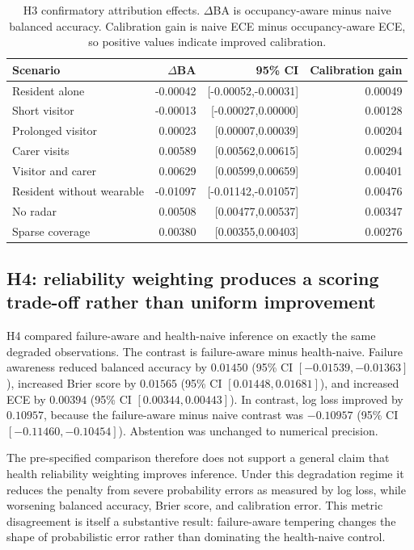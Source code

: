 \begin{table}[t]
\centering
\small
\caption{H3 confirmatory attribution effects. $\Delta$BA is occupancy-aware minus naive balanced accuracy. Calibration gain is naive ECE minus occupancy-aware ECE, so positive values indicate improved calibration.}
\label{tab:h3-confirmatory}
\begin{tabular}{lrrr}
\toprule
Scenario & $\Delta$BA & 95\% CI & Calibration gain \\
\midrule
Resident alone & -0.00042 & [-0.00052,-0.00031] & 0.00049 \\
Short visitor & -0.00013 & [-0.00027,0.00000] & 0.00128 \\
Prolonged visitor & 0.00023 & [0.00007,0.00039] & 0.00204 \\
Carer visits & 0.00589 & [0.00562,0.00615] & 0.00294 \\
Visitor and carer & 0.00629 & [0.00599,0.00659] & 0.00401 \\
Resident without wearable & -0.01097 & [-0.01142,-0.01057] & 0.00476 \\
No radar & 0.00508 & [0.00477,0.00537] & 0.00347 \\
Sparse coverage & 0.00380 & [0.00355,0.00403] & 0.00276 \\
\bottomrule
\end{tabular}
\end{table}

\subsection{H4: reliability weighting produces a scoring trade-off rather than uniform improvement}

H4 compared failure-aware and health-naive inference on exactly the same degraded observations. The contrast is failure-aware minus health-naive. Failure awareness reduced balanced accuracy by $0.01450$ (95\% CI $[-0.01539,-0.01363]$), increased Brier score by $0.01565$ (95\% CI $[0.01448,0.01681]$), and increased ECE by $0.00394$ (95\% CI $[0.00344,0.00443]$). In contrast, log loss improved by $0.10957$, because the failure-aware minus naive contrast was $-0.10957$ (95\% CI $[-0.11460,-0.10454]$). Abstention was unchanged to numerical precision.

The pre-specified comparison therefore does not support a general claim that health reliability weighting improves inference. Under this degradation regime it reduces the penalty from severe probability errors as measured by log loss, while worsening balanced accuracy, Brier score, and calibration error. This metric disagreement is itself a substantive result: failure-aware tempering changes the shape of probabilistic error rather than dominating the health-naive control.

